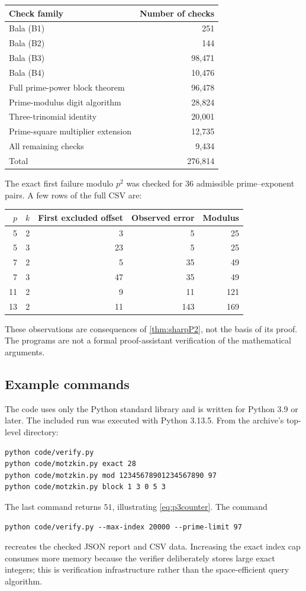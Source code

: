 \documentclass[11pt,a4paper]{article}
\numberwithin{equation}{section}
\theoremstyle{definition}
\theoremstyle{remark}
\begin{document}
\begin{center}
\begin{tabular}{@{}lr@{}}
\toprule
Check family & Number of checks\\
\midrule
Bala (B1) & 251\\
Bala (B2) & 144\\
Bala (B3) & 98,471\\
Bala (B4) & 10,476\\
Full prime-power block theorem & 96,478\\
Prime-modulus digit algorithm & 28,824\\
Three-trinomial identity & 20,001\\
Prime-square multiplier extension & 12,735\\
All remaining checks & 9,434\\
\midrule
Total & 276,814\\
\bottomrule
\end{tabular}
\end{center}

The exact first failure modulo $p^2$ was checked for 36 admissible
prime--exponent pairs. A few rows of the full CSV are:
\begin{center}
\begin{tabular}{@{}rrrrr@{}}
\toprule
$p$ & $k$ & First excluded offset & Observed error & Modulus\\
\midrule
5 & 2 & 3 & 5 & 25\\
5 & 3 & 23 & 5 & 25\\
7 & 2 & 5 & 35 & 49\\
7 & 3 & 47 & 35 & 49\\
11 & 2 & 9 & 11 & 121\\
13 & 2 & 11 & 143 & 169\\
\bottomrule
\end{tabular}
\end{center}
These observations are consequences of \cref{thm:sharpP2}, not the
basis of its proof. The programs are not a formal proof-assistant
verification of the mathematical arguments.

\subsection{Example commands}
The code uses only the Python standard library and is written for
Python 3.9 or later. The included run was executed with Python 3.13.5.
From the archive's top-level directory:
\begin{lstlisting}
python code/verify.py
python code/motzkin.py exact 28
python code/motzkin.py mod 12345678901234567890 97
python code/motzkin.py block 1 3 0 5 3
\end{lstlisting}
The last command returns $51$, illustrating \eqref{eq:p3counter}.
The command
\begin{lstlisting}
python code/verify.py --max-index 20000 --prime-limit 97
\end{lstlisting}
recreates the checked JSON report and CSV data. Increasing the exact
index cap consumes more memory because the verifier deliberately stores
large exact integers; this is verification infrastructure rather than the
space-efficient query algorithm.
\end{document}
